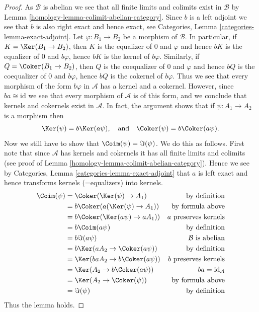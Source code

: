 \begin{proof}

As $\mathcal{B}$ is abelian we see that all finite limits and colimits
exist in $\mathcal{B}$ by Lemma \ref{homology-lemma-colimit-abelian-category}.
Since $b$ is a left adjoint we see that $b$ is also right exact
and hence exact, see
Categories, Lemma \ref{categories-lemma-exact-adjoint}.
Let $\varphi : B_1 \to B_2$ be a morphism of $\mathcal{B}$.
In particular, if $K = \Ker(B_1 \to B_2)$, then $K$ is
the equalizer of $0$ and $\varphi$ and hence
$bK$ is the equalizer of $0$ and $b\varphi$, hence
$bK$ is the kernel of $b\varphi$. Similarly, if
$Q = \Coker(B_1 \to B_2)$, then $Q$ is
the coequalizer of $0$ and $\varphi$ and hence
$bQ$ is the coequalizer of $0$ and $b\varphi$, hence
$bQ$ is the cokernel of $b\varphi$. Thus we see that every morphism
of the form $b\varphi$ in $\mathcal{A}$ has a kernel and a cokernel.
However, since $ba \cong \text{id}$ we see that every morphism of
$\mathcal{A}$ is of this form, and we conclude that kernels and
cokernels exist in $\mathcal{A}$. In fact, the argument shows that
if $\psi : A_1 \to A_2$ is a morphism then
$$
\Ker(\psi) = b\Ker(a\psi),
\quad\text{and}\quad
\Coker(\psi) = b\Coker(a\psi).
$$
Now we still have to show that $\Coim(\psi)= \Im(\psi)$.
We do this as follows.
First note that since $\mathcal{A}$ has kernels and cokernels it
has all finite limits and colimits (see proof of
Lemma \ref{homology-lemma-colimit-abelian-category}).
Hence we see by Categories, Lemma \ref{categories-lemma-exact-adjoint}
that $a$ is left exact and
hence transforms kernels (=equalizers) into kernels.
\begin{align*}
\Coim(\psi)
& =
\Coker(\Ker(\psi) \to A_1)
& \text{by definition} \\
& =
b\Coker(a(\Ker(\psi) \to A_1))
& \text{by formula above} \\
& =
b\Coker(\Ker(a\psi) \to aA_1))
& a\text{ preserves kernels} \\
& =
b\Coim(a\psi)
& \text{by definition} \\
& =
b\Im(a\psi)
& \mathcal{B}\text{ is abelian} \\
& =
b\Ker(aA_2 \to \Coker(a\psi))
& \text{by definition} \\
& =
\Ker(baA_2 \to b\Coker(a\psi))
& b\text{ preserves kernels} \\
& =
\Ker(A_2 \to b\Coker(a\psi))
& ba = \text{id}_\mathcal{A} \\
& =
\Ker(A_2 \to \Coker(\psi))
& \text{by formula above} \\
& =
\Im(\psi)
& \text{by definition}
\end{align*}
Thus the lemma holds.
\end{proof}

